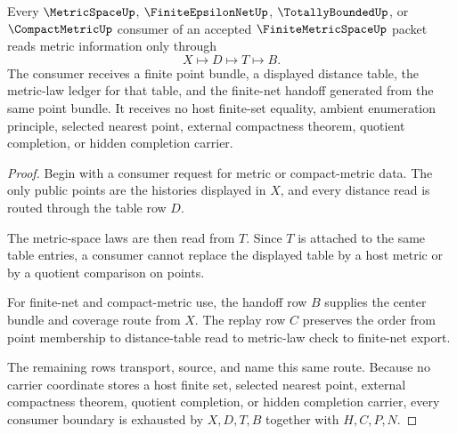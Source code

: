 \begin{theorem}
\label{thm:finite-metric-space-distance-table-boundary}
Every $\MetricSpaceUp$, $\FiniteEpsilonNetUp$, $\TotallyBoundedUp$, or $\CompactMetricUp$ consumer of an accepted $\FiniteMetricSpaceUp$ packet reads metric information only through
$$
X \longmapsto D \longmapsto T \longmapsto B .
$$
The consumer receives a finite point bundle, a displayed distance table, the metric-law ledger for that table, and the finite-net handoff generated from the same point bundle. It receives no host finite-set equality, ambient enumeration principle, selected nearest point, external compactness theorem, quotient completion, or hidden completion carrier.
\end{theorem}
\begin{proof}
Begin with a consumer request for metric or compact-metric data. The only public points are the histories displayed in $X$, and every distance read is routed through the table row $D$.

The metric-space laws are then read from $T$. Since $T$ is attached to the same table entries, a consumer cannot replace the displayed table by a host metric or by a quotient comparison on points.

For finite-net and compact-metric use, the handoff row $B$ supplies the center bundle and coverage route from $X$. The replay row $C$ preserves the order from point membership to distance-table read to metric-law check to finite-net export.

The remaining rows transport, source, and name this same route. Because no carrier coordinate stores a host finite set, selected nearest point, external compactness theorem, quotient completion, or hidden completion carrier, every consumer boundary is exhausted by $X,D,T,B$ together with $H,C,P,N$.
\end{proof}

\begin{closurestatus}{\FiniteMetricSpaceUp}
  \theoryclosure{\seedClosure}
  \formalstatus{\theoremCheckedV}
\end{closurestatus}
